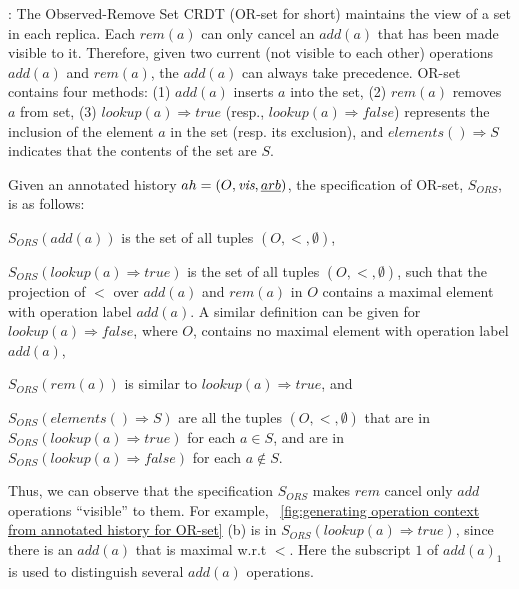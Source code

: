 :
%
The Observed-Remove Set CRDT (OR-set for short)
\cite{Shapiro:2011,Bieniusa:2012} maintains the view of a set in
each replica. Each $\mathit{rem}(a)$ can only cancel an
$\mathit{add}(a)$ that has been made visible to it. Therefore, given
two current (not visible to each other) operations $\mathit{add}(a)$
and $\mathit{rem}(a)$, the $\mathit{add}(a)$ can always take
precedence. 
OR-set contains four methods: (1)
$\mathit{add}(a)$ inserts $a$ into the set, (2) $\mathit{rem}(a)$
removes $a$ from set, (3) \mbox{$\mathit{lookup}(a)\Rightarrow
  \mathit{true}$} (resp., \mbox{$\mathit{lookup}(a)\Rightarrow
  \mathit{false}$}) represents the inclusion of the element $a$ in the
set (resp. its exclusion), and $\mathit{elements}() \Rightarrow S$
indicates that the contents of the set are $S$.

Given an annotated history $ah = (O, \textit{vis}, \emph{arb})$, the
specification of OR-set, $S_{\mathit{ORS}}$, is as follows:
\begin{inparaenum}[(1)]
\item $S_{\mathit{ORS}}(\mathit{add}(a))$ is the set of all tuples
  $(O,<,\emptyset)$,
\item $S_{\mathit{ORS}}(\mathit{lookup}(a) \Rightarrow \mathit{true})$
  is the set of all tuples $(O,<,\emptyset)$, such that the projection
  of $<$ over $\mathit{add}(a)$ and $\mathit{rem}(a)$ in $O$ contains a
  maximal element with operation label $\mathit{add}(a)$.
  A similar definition can be given for $\mathit{lookup}(a)
  \Rightarrow \mathit{false}$, where $O$, contains no maximal element
  with operation label $\mathit{add}(a)$,
\item $S_{\mathit{ORS}}(\mathit{rem}(a))$ is similar to
  $\mathit{lookup}(a) \Rightarrow \mathit{true}$, and
\item $S_{\mathit{ORS}}(\mathit{elements}() \Rightarrow S)$ are all
  the tuples $(O,<,\emptyset)$ that are in
  $S_{\mathit{ORS}}(\mathit{lookup}(a) \Rightarrow \mathit{true})$ for
  each $a \in S$, and are in $S_{\mathit{ORS}}(\mathit{lookup}(a)
  \Rightarrow \mathit{false})$ for each $a \notin S$.
 \end{inparaenum}
 Thus, we can observe that the specification $S_{\mathit{ORS}}$ makes
 $\mathit{rem}$ cancel only $\mathit{add}$ operations ``visible'' to
 them.
 For example, \figurename~\ref{fig:generating operation context from annotated history for OR-set} (b) is in $S_{\mathit{ORS}}(\mathit{lookup}(a)
 \Rightarrow \mathit{true})$, since there is an $\mathit{add}(a)$ that
 is maximal w.r.t $<$. Here the subscript $1$ of $\mathit{add}(a)_1$
 is used to distinguish several $\mathit{add}(a)$ operations.


